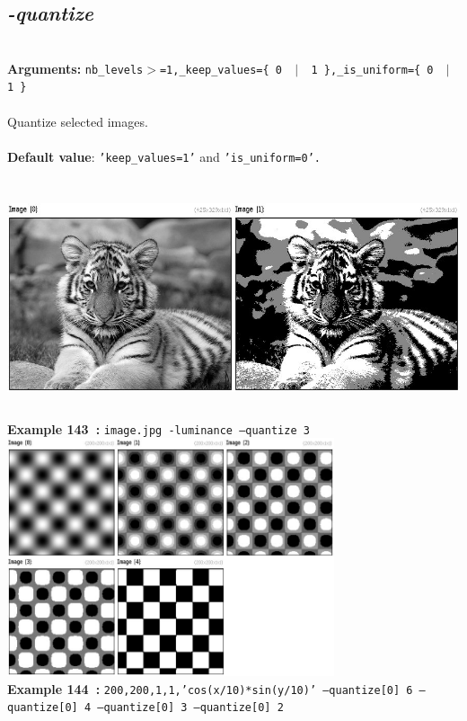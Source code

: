 \documentclass[a4paper,11pt,twoside]{book}
\begin{document}
\subsection{\emph{-quantize} }\vspace*{-0.5em}
~\\\textbf{Arguments: } 
{\small \texttt{nb\_levels$>$=1,\_keep\_values=\{ 0 ~$|$~ 1 \},\_is\_uniform=\{ 0 ~$|$~ 1 \}}}\\~\\
Quantize selected images.
~\\~\\\textbf{Default value}: {\small \texttt{'keep\_values=1'} and \texttt{'is\_uniform=0'.}}
\begin{center}\includegraphics[keepaspectratio=true,height=7cm,width=\textwidth]{img/gmic_def143.jpg}\\
{\footnotesize \textbf{Example 143~:} \texttt{image.jpg -luminance --quantize 3}}
\\\includegraphics[keepaspectratio=true,height=7cm,width=\textwidth]{img/gmic_def144.jpg}\\
{\footnotesize \textbf{Example 144~:} \texttt{200,200,1,1,'cos(x/10)*sin(y/10)' --quantize[0] 6 --quantize[0] 4 --quantize[0] 3 --quantize[0] 2}}
\end{center}
\end{document}
